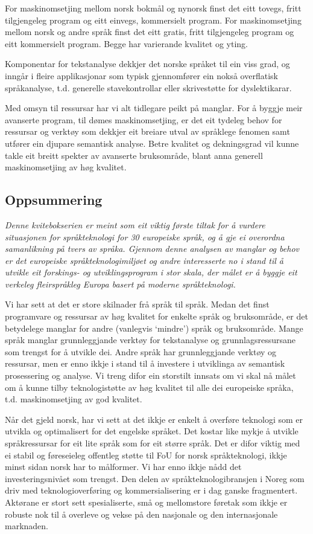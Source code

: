 \begin{multicols}{2}
For maskinomsetjing mellom norsk bokmål og nynorsk finst det eitt tovegs, fritt tilgjengeleg program og eitt einvegs, kommersielt program. 
For maskinomsetjing mellom norsk og andre språk finst det eitt gratis, fritt tilgjengeleg program og eitt kommersielt program. Begge har varierande kvalitet og yting.

Komponentar for tekstanalyse dekkjer det norske språket til ein viss grad, og inngår i fleire applikasjonar som typisk gjennomfører ein nokså overflatisk språkanalyse, t.d. generelle stavekontrollar eller skrivestøtte for dyslektikarar.

Med omsyn til ressursar har vi alt tidlegare peikt på manglar.
For å byggje meir avanserte program, til dømes maskinomsetjing, er det eit tydeleg behov for ressursar og verktøy som dekkjer eit breiare utval av språklege fenomen samt utfører ein djupare semantisk analyse. Betre kvalitet og dekningsgrad vil kunne takle eit breitt spekter av avanserte bruksområde, blant anna generell maskinomsetjing av høg kvalitet.

\subsection{Oppsummering}

\emph{Denne kvitebokserien er meint som eit viktig første tiltak for å vurdere situasjonen for språkteknologi for 30 europeiske språk, og å gje ei overordna samanlikning på tvers av språka. Gjennom denne analysen av manglar og behov er det europeiske språkteknologimiljøet og andre interesserte no i stand til å utvikle eit forskings- og utviklingsprogram i stor skala, der målet er å byggje eit verkeleg fleirspråkleg Europa basert på moderne språkteknologi.}

Vi har sett at det er store skilnader frå språk til språk. Medan det finst programvare og ressursar av høg kvalitet for enkelte språk og bruksområde, er det betydelege manglar for andre (vanlegvis `mindre') språk og bruksområde. Mange språk manglar grunnleggjande verktøy for tekstanalyse og grunnlagsressursane som trengst for å utvikle dei. Andre språk har grunnleggjande verktøy og ressursar, men er enno ikkje i stand til å investere i utviklinga av semantisk prosessering og analyse. Vi treng difor ein storstilt innsats om vi skal nå målet om å kunne tilby teknologistøtte av høg kvalitet til alle dei europeiske språka, t.d. maskinomsetjing av god kvalitet.

Når det gjeld norsk, har vi sett at det ikkje er enkelt å overføre teknologi som er utvikla og optimalisert for det engelske språket. 
Det kostar like mykje å utvikle språkressursar for eit lite språk som for eit større språk. Det er difor viktig med ei stabil og føreseieleg offentleg støtte til FoU for norsk språkteknologi, ikkje minst sidan norsk har to målformer. 
Vi har enno ikkje nådd det investeringsnivået som trengst. Den delen av språkteknologibransjen i Noreg som driv med teknologioverføring og kommersialisering er i dag ganske fragmentert. Aktørane er stort sett spesialiserte, små og mellomstore føretak som ikkje er robuste nok til å overleve og vekse på den nasjonale og den internasjonale marknaden.


\end{multicols}
